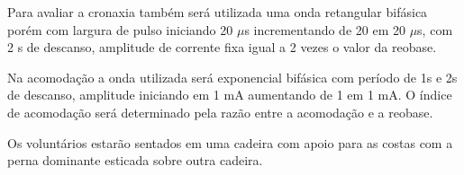 \documentclass[a4paper,10pt]{article}
\begin{document}
Para avaliar a cronaxia também será utilizada uma onda retangular bifásica porém com largura de pulso iniciando 20 $\mu$s incrementando de 20 em 20 $\mu$s, com 2 s de descanso, amplitude de corrente fixa igual a 2 vezes o valor da reobase.

Na acomodação a onda utilizada será exponencial bifásica com período de 1s e 2s de descanso, amplitude iniciando em 1 mA aumentando de 1 em 1 mA.
O índice de acomodação será determinado pela razão entre a acomodação e a reobase.

Os voluntários estarão sentados em uma cadeira com apoio para as costas com a perna dominante esticada sobre outra cadeira.
\end{document}

